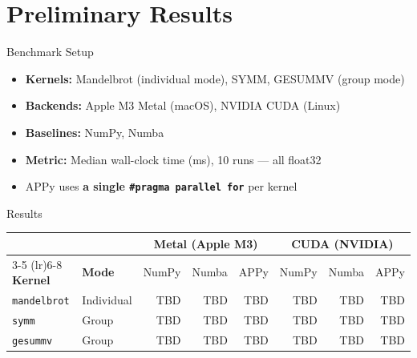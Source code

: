 \documentclass[aspectratio=169]{beamer}
\begin{document}
\section{Preliminary Results}

\begin{frame}{Benchmark Setup}
  \begin{itemize}
    \item \textbf{Kernels:} Mandelbrot (individual mode), SYMM, GESUMMV (group mode)
    \item \textbf{Backends:} Apple M3 Metal (macOS), NVIDIA CUDA (Linux)
    \item \textbf{Baselines:} NumPy, Numba
    \item \textbf{Metric:} Median wall-clock time (ms), 10 runs — all float32
    \item APPy uses \textbf{a single \texttt{\#pragma parallel for}} per kernel
  \end{itemize}
\end{frame}

\begin{frame}{Results}
  \centering
  \footnotesize
  \begin{tabular}{llrrrrrr}
    \toprule
    & & \multicolumn{3}{c}{\textbf{Metal (Apple M3)}} & \multicolumn{3}{c}{\textbf{CUDA (NVIDIA)}} \\
    \cmidrule(lr){3-5} \cmidrule(lr){6-8}
    \textbf{Kernel} & \textbf{Mode} & NumPy & Numba & APPy & NumPy & Numba & APPy \\
    \midrule
    \texttt{mandelbrot} & Individual & TBD & TBD & TBD & TBD & TBD & TBD \\
    \texttt{symm}       & Group      & TBD & TBD & TBD & TBD & TBD & TBD \\
    \texttt{gesummv}    & Group      & TBD & TBD & TBD & TBD & TBD & TBD \\
    \bottomrule
  \end{tabular}
\end{frame}
\end{document}
